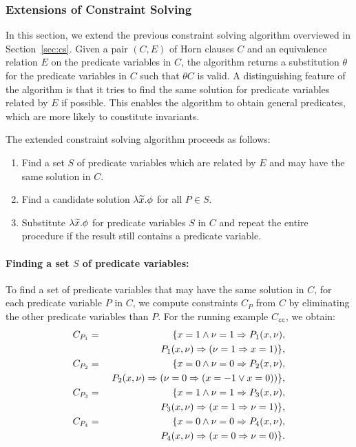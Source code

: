 \subsubsection{Extensions of Constraint Solving}
\label{sec:extcs}

In this section, we extend the previous constraint solving algorithm 
overviewed in Section~\ref{sec:cs}.  Given a pair \((C,E)\) of Horn 
clauses \(C\) and an equivalence relation \(E\) on the predicate 
variables in \(C\), the algorithm returns a substitution \(\theta\) for 
the predicate variables in \(C\) such that \(\theta C\) is valid.  A 
distinguishing feature of the algorithm is that it tries to find the 
same solution for predicate variables related by \(E\) if possible.  
This enables the algorithm to obtain general predicates, which are more 
likely to constitute invariants. %


The extended constraint solving algorithm proceeds as follows:
\begin{enumerate}
\item Find a set \(S\) of predicate variables which are related by \(E\) 
and may have the same solution in \(C\).
\item Find a candidate solution \(\lambda \widetilde{x}.\phi\) for all \(P \in 
S\).
\item Substitute \(\lambda \widetilde{x}.\phi\) for predicate variables \(S\) 
in \(C\) and repeat the entire procedure if the result still contains a 
predicate variable.
\end{enumerate}

\paragraph{Finding a set \(S\) of predicate variables:}
To find a set of predicate variables that may have the same solution in 
\(C\), for each predicate variable \(P\) in \(C\), we compute 
constraints \(C_P\) from \(C\) by eliminating the other predicate 
variables than \(P\).
%
For the running example \(C_{\texttt{cc}}\), we obtain:
\begin{eqnarray*}
C_{P_1}&=&\{x=1 \land \nu=1 \Rightarrow P_1(x,\nu), \\
&&\ P_1(x,\nu) \Rightarrow (\nu=1 \Rightarrow x=1)\}, \\
C_{P_2}&=&\{x=0 \land \nu=0 \Rightarrow P_2(x,\nu), \\
&&\ P_2(x,\nu) \Rightarrow (\nu=0 \Rightarrow (x=-1 \lor x=0))\}, \\
C_{P_3}&=&\{x=1 \land \nu=1 \Rightarrow P_3(x,\nu), \\
&&\ P_3(x,\nu) \Rightarrow (x=1 \Rightarrow \nu=1)\}, \\
C_{P_4}&=&\{x=0 \land \nu=0 \Rightarrow P_4(x,\nu), \\
&&\ P_4(x,\nu) \Rightarrow (x=0 \Rightarrow \nu=0)\}.
\end{eqnarray*}

